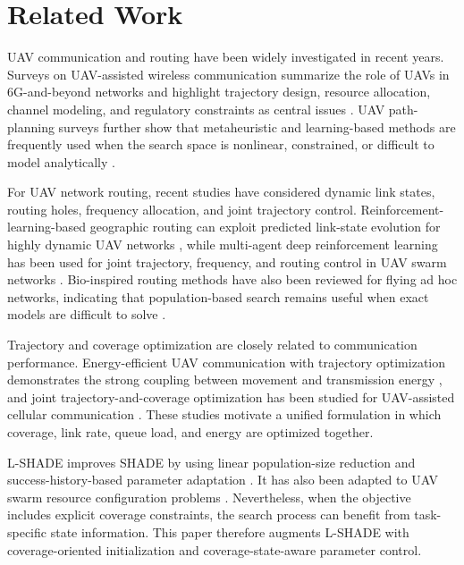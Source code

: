 \documentclass[lettersize,journal]{IEEEtran}
\begin{document}
\section{Related Work}
UAV communication and routing have been widely investigated in recent years. Surveys on UAV-assisted wireless communication summarize the role of UAVs in 6G-and-beyond networks and highlight trajectory design, resource allocation, channel modeling, and regulatory constraints as central issues \cite{Mahbub2025UAV}. UAV path-planning surveys further show that metaheuristic and learning-based methods are frequently used when the search space is nonlinear, constrained, or difficult to model analytically \cite{Jiang2024Evolutionary,Ghambari2024UAV,Agrawal2024Metaheuristic,Elnabty2022Survey}.

For UAV network routing, recent studies have considered dynamic link states, routing holes, frequency allocation, and joint trajectory control. Reinforcement-learning-based geographic routing can exploit predicted link-state evolution for highly dynamic UAV networks \cite{Xu2026EvoQGeo}, while multi-agent deep reinforcement learning has been used for joint trajectory, frequency, and routing control in UAV swarm networks \cite{Alam2024JointTrajectory}. Bio-inspired routing methods have also been reviewed for flying ad hoc networks, indicating that population-based search remains useful when exact models are difficult to solve \cite{Beegum2023FANETReview}.

Trajectory and coverage optimization are closely related to communication performance. Energy-efficient UAV communication with trajectory optimization demonstrates the strong coupling between movement and transmission energy \cite{Zeng2017EnergyEfficient}, and joint trajectory-and-coverage optimization has been studied for UAV-assisted cellular communication \cite{Li2021CoverageOptimization}. These studies motivate a unified formulation in which coverage, link rate, queue load, and energy are optimized together.

L-SHADE improves SHADE by using linear population-size reduction and success-history-based parameter adaptation \cite{Tanabe2014LSHADE}. It has also been adapted to UAV swarm resource configuration problems \cite{Li2022ALSHADE}. Nevertheless, when the objective includes explicit coverage constraints, the search process can benefit from task-specific state information. This paper therefore augments L-SHADE with coverage-oriented initialization and coverage-state-aware parameter control.
\end{document}
